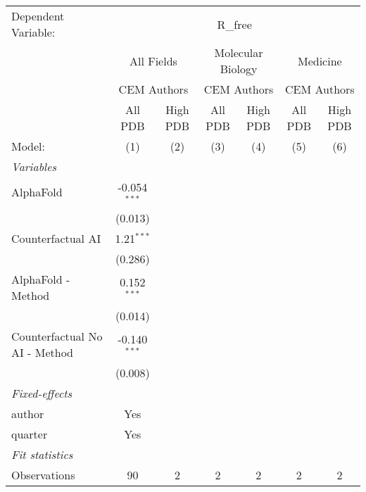 \begingroup
\centering
\begin{tabular}{lcccccc}
   \tabularnewline \midrule \midrule
   Dependent Variable: & \multicolumn{6}{c}{R\_free}\\
 & \multicolumn{2}{c}{All Fields} & \multicolumn{2}{c}{Molecular Biology} & \multicolumn{2}{c}{Medicine} \\
\cmidrule(lr){2-3} \cmidrule(lr){4-5} \cmidrule(lr){6-7}
 & \multicolumn{2}{c}{CEM Authors} & \multicolumn{2}{c}{CEM Authors} & \multicolumn{2}{c}{CEM Authors} \\
\cmidrule(lr){2-3} \cmidrule(lr){4-5} \cmidrule(lr){6-7}
 & \multicolumn{1}{c}{All PDB} & \multicolumn{1}{c}{High PDB} & \multicolumn{1}{c}{All PDB} & \multicolumn{1}{c}{High PDB} & \multicolumn{1}{c}{All PDB} & \multicolumn{1}{c}{High PDB} \\
\cmidrule(lr){2-2} \cmidrule(lr){3-3} \cmidrule(lr){4-4} \cmidrule(lr){5-5} \cmidrule(lr){6-6} \cmidrule(lr){7-7}
   Model:                        & (1)            & (2) & (3) & (4) & (5) & (6)\\  
   \midrule
   \emph{Variables}\\
   AlphaFold                     & -0.054$^{***}$ &     &     &     &     &   \\   
                                 & (0.013)        &     &     &     &     &   \\   
   Counterfactual AI             & 1.21$^{***}$   &     &     &     &     &   \\   
                                 & (0.286)        &     &     &     &     &   \\   
   AlphaFold - Method            & 0.152$^{***}$  &     &     &     &     &   \\   
                                 & (0.014)        &     &     &     &     &   \\   
   Counterfactual No AI - Method & -0.140$^{***}$ &     &     &     &     &   \\   
                                 & (0.008)        &     &     &     &     &   \\   
   \midrule
   \emph{Fixed-effects}\\
   author                        & Yes            &     &     &     &     & \\  
   quarter                       & Yes            &     &     &     &     & \\  
   \midrule
   \emph{Fit statistics}\\
   Observations                  & 90             & 2   & 2   & 2   & 2   & 2\\  

\end{tabular}

